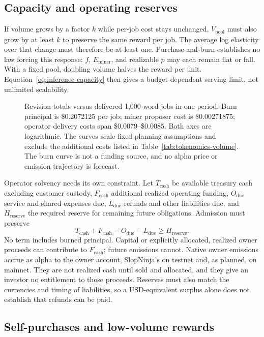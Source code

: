 \subsection{Capacity and operating reserves}

If volume grows by a factor \(k\) while per-job cost stays unchanged, \(V_{\mathrm{pool}}\)
must also grow by at least \(k\) to preserve the same reward per job. The average
log elasticity over that change must therefore be at least one.
Purchase-and-burn establishes no law forcing this response:
\(f\), \(E_{\mathrm{miner}}\), and realizable \(p\) may each remain flat or fall. With a fixed
pool, doubling volume halves the reward per unit. Equation~\ref{eq:inference-capacity}
then gives a budget-dependent serving limit, not unlimited scalability.

\begin{figure}[htbp]
\centering

\caption{Revision totals versus delivered 1,000-word jobs in one period.
Burn principal is \$0.2072125 per job; miner proposer cost is \$0.00271875;
operator delivery costs span \$0.0079--\$0.0085. Both axes are logarithmic.
The curves scale fixed planning assumptions and exclude the additional costs
listed in Table~\ref{tab:tokenomics-volume}. The burn curve is not a funding
source, and no alpha price or emission trajectory is forecast.}
\label{fig:volume-sensitivity}
\end{figure}

Operator solvency needs its own constraint. Let \(T_{\mathrm{cash}}\) be available treasury
cash excluding customer custody, \(F_{\mathrm{cash}}\) additional realized operating funding,
\(O_{\mathrm{due}}\) service and shared expenses due, \(L_{\mathrm{due}}\) refunds and other liabilities
due, and \(H_{\mathrm{reserve}}\) the required reserve for remaining future obligations. Admission
must preserve
\[
 T_{\mathrm{cash}}+F_{\mathrm{cash}}-O_{\mathrm{due}}-L_{\mathrm{due}}\ge H_{\mathrm{reserve}}.
\]
No term includes burned principal. Capital or explicitly allocated, realized
owner proceeds can contribute to \(F_{\mathrm{cash}}\); future emissions cannot. Native owner
emissions accrue as alpha to the owner account, SlopNinja's on testnet and, as
planned, on mainnet. They are not realized cash until sold and allocated, and
they give an investor no entitlement to those proceeds. Reserves must also match
the currencies and timing of liabilities, so a USD-equivalent surplus alone
does not establish that refunds can be paid.

\subsection{Self-purchases and low-volume rewards}

